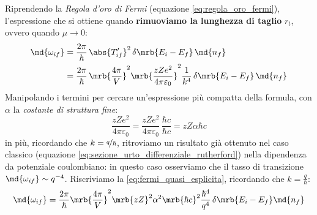 Riprendendo la \textit{Regola d'oro di Fermi} (equazione
\ref{eq:regola_oro_fermi}), l'espressione che si ottiene quando
\textbf{rimuoviamo la lunghezza di taglio} $r_t$, ovvero quando $\mu \to 0$:
\begin{equation}
	\begin{split}
		\md{\omega_{if}}
		& = \frac{2\pi}{\hbar} \, \abs{T_{if}^\prime}^2 \, \delta\mrb{E_i - E_f}
		\, \md{n_f} \\
		& = \frac{2\pi}{\hbar} \, \mrb{\frac{4\pi}{V}}^2
		\mrb{\frac{zZe^2}{4\pi\varepsilon_0}}^2 \frac{1}{k^4} \,
		\delta\mrb{E_i - E_f} \, \md{n_f}
	\end{split}
	\label{eq:fermi_quasi_esplicita}
\end{equation}
Manipolando i termini per cercare un'espressione più compatta della formula,
con $\alpha$ la \textit{costante di struttura fine}:
\begin{equation}
	\frac{zZe^2}{4\pi\varepsilon_0} = \frac{zZe^2}{4\pi\varepsilon_0} \,
	\frac{\hbar c}{\hbar c} = zZ \alpha \hbar c
\end{equation}
in più, ricordando che $k = \nicefrac{q}{\hbar}$, ritroviamo un risultato già
ottenuto nel caso classico (equazione
\ref{eq:sezione_urto_differenziale_rutherford}) nella dipendenza da potenziale
coulombiano: in questo caso osserviamo che il tasso di transizione
$\md{\omega_{if}} \sim q^{-4}$.
Riscriviamo la \ref{eq:fermi_quasi_esplicita}, ricordando che $k =
	\frac{q}{\hbar}$:
\begin{equation}
	\md{\omega_{if}} = \frac{2\pi}{\hbar} \mrb{\frac{4\pi}{V}}^2 \mrb{zZ}^2
	\alpha^2 \mrb{\hbar c}^2 \frac{\hbar^4}{q^4} \, \delta\mrb{E_i - E_f}
	\md{n_f}
\end{equation}
